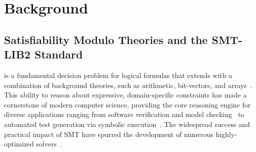 \section{Background}
\label{sec:background}

\subsection{Satisfiability Modulo Theories and the SMT-LIB2 Standard}
\SMT{} is a fundamental decision problem for logical formulas that extends \SAT{} with a combination of background theories, such as arithmetic, bit-vectors, and arrays~\cite{kroening2016decision}. This ability to reason about expressive, domain-specific constraints has made \SMT{} a cornerstone of modern computer science, providing the core reasoning engine for diverse applications ranging from software verification and model checking~\cite{ball2004slam} to automated test generation via symbolic execution~\cite{cadar2008klee}. The widespread success and practical impact of SMT have spurred the development of numerous highly-optimized solvers~\cite{demoura2008z3,mathsat5,cvc5}.

